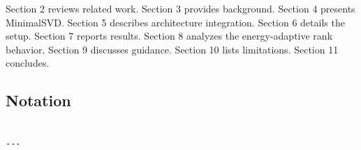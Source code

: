 Section 2 reviews related work. Section 3 provides background. Section 4 
presents MinimalSVD. Section 5 describes architecture integration. Section 
6 details the setup. Section 7 reports results. Section 8 analyzes the 
energy-adaptive rank behavior. Section 9 discusses guidance. Section 10 
lists limitations. Section 11 concludes.



\subsection{Notation}

\begin{lstlisting}

---
\end{lstlisting}